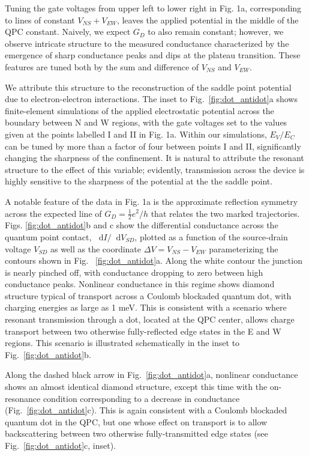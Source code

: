 \documentclass[reprint,prl,aps,superscriptaddress]{revtex4-1}
\newcommand\dif{\mathop{}\!\mathrm{d}}
\begin{document}
Tuning the gate voltages from upper left to lower right in Fig. 1a, corresponding to lines of constant $V_{NS} + V_{EW}$, leaves the applied potential in the middle of the QPC constant.  Naively, we expect $G_D$ to also remain constant; however, we observe intricate structure to the measured conductance characterized by the emergence of sharp conductance peaks and dips at the plateau transition.  These features are tuned both by the sum and difference of $V_{NS}$ and $V_{EW}$.  

We attribute this structure to the reconstruction of the saddle point potential due to electron-electron  interactions. The inset to Fig.~\ref{fig:dot_antidot}a shows finite-element simulations of the applied electrostatic potential across the boundary between N and W regions, with the gate voltages set to the values given at the points labelled I and II in Fig. 1a.  Within our  simulations, $E_V/E_C$ can be tuned by more than a factor of four between points I and II, significantly changing the sharpness of the confinement.  It is natural to attribute the resonant structure to the effect of this variable; evidently, transmission across the device is highly sensitive to the  sharpness of the potential at the  the saddle point.

A notable feature of the data in Fig. 1a is the approximate reflection symmetry across the expected line of $G_D=\frac{1}{2}e^2/h$ that relates the two marked trajectories.  
Figs. \ref{fig:dot_antidot}b and c show the differential conductance across the quantum point contact, $\dif I/ \dif V_{SD}$, plotted as a function of the source-drain voltage $V_{SD}$ as well as the coordinate $\Delta V = V_{NS} - V_{EW}$ parameterizing the contours shown in Fig.~ \ref{fig:dot_antidot}a. Along the white contour the junction is nearly pinched off, with conductance dropping to zero between high conductance peaks.  Nonlinear conductance in this regime shows diamond structure typical of transport across a Coulomb blockaded quantum dot, with charging energies as large as 1 meV.  This is consistent with a scenario where resonant transmission through a dot, located at the QPC center, allows charge transport between two otherwise fully-reflected edge states in the E and W regions.  This scenario is illustrated schematically in the inset to Fig.~\ref{fig:dot_antidot}b. 

Along the dashed black arrow in Fig.~\ref{fig:dot_antidot}a, nonlinear conductance shows an almost identical diamond structure, except this time with the on-resonance condition corresponding to a decrease in conductance (Fig.~\ref{fig:dot_antidot}c). This is again consistent with a Coulomb blockaded quantum dot in the QPC, but one whose effect on transport is to allow backscattering between two otherwise fully-transmitted edge states (see Fig.~\ref{fig:dot_antidot}c, inset). 
\end{document}
